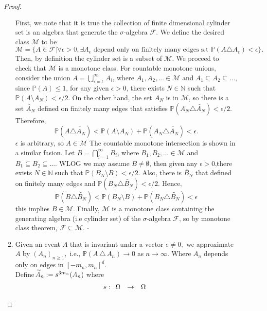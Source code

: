 \documentclass[12pt,a4paper]{report}
\theoremstyle{definition}
\newcommand{\oversim}[1]{\parbox[t][-18pt][c]{10pt}{\scriptsize$\sim$}\hspace*{-12pt}{#1}}
\begin{document}
\begin{enumerate}
\begin{proof}
\begin{enumerate}
				First, we note that it is true the collection of finite dimensional cylinder set is an algebra that generate the $\sigma$-algebra $\mathcal{F}$. We define the desired class $\mathcal{M}$ to be 
				$$
				\mathcal{M} = \{A \in \mathcal{F} | \forall \epsilon > 0, \exists A_\epsilon \text{ depend only on finitely many edges s.t }  \mathbb{P}(A\triangle A_\epsilon) < \epsilon\}.
				$$
				Then, by definition the cylinder set is a subset of $\mathcal{M}$. We proceed to check that $\mathcal{M}$ is a monotone class.
				For countable monotone unions, consider the union $A = \bigcup_{i =1}^\infty A_i$, where $A_1, A_2, \dots \in \mathcal{M}$ and $A_1\subseteq A_2 \subseteq \dots$, since $\mathbb{P}(A) \leq 1$, for any given $\epsilon > 0$, there exists $N \in \mathbb{N}$ such that $\mathbb{P}(A\setminus  A_{N}  ) < \epsilon/2$. 
				On the other hand, the set $A_{N}$ is in $\mathcal{M}$, so there is a set $\tilde{A_{N}}$ defined on finitely many edges that satisfies $\mathbb{P}(A_{N} \triangle \tilde{A_{N}}) < \epsilon/2$. 
				Therefore, 
				$$
					\mathbb{P}(A\triangle \tilde{A_N}) < \mathbb{P}(A\setminus A_N) + \mathbb{P}(A_N\triangle \tilde{A_N}) < \epsilon .
				$$
				$\epsilon$ is arbitrary, so $A \in \mathcal{M}$
				The countable monotone intersection is shown in a similar fasion. Let $B = \bigcap_{i = 1}^\infty B_i$, where $B_1, B_2, \dots \in \mathcal{M}$ and $B_1 \subseteq B_2 \subseteq \dots$. WLOG we may assume $B \neq \emptyset$, then given any $\epsilon > 0$,there exists $N \in \mathbb{N}$ such that $\mathbb{P}(B_N \setminus B) < \epsilon/2$.
				Also, there is $\tilde{B_N}$ that defined on finitely many edges and $\mathbb{P}(B_N \triangle \tilde{B_N}) < \epsilon /2$. Hence,
				$$
					\mathbb{P}(B \triangle \tilde{B_N}) < \mathbb{P}(B_N \setminus B) + \mathbb{P}(B_N \triangle \tilde{B_N}) < \epsilon
				$$
				this implies $B \in \mathcal{M}$.
				Finally,  $\mathcal{M}$ is a monotone class containing the generating algebra (i.e cylinder set) of the $\sigma$-algebra $\mathcal{F}$, so by monotone class theorem, $\mathcal{F} \subseteq \mathcal{M}$. $\square$
		\item[] \qquad Given an event $A$ that is invariant under a vector $e\neq 0,$ we approximate $A$ by $(A_n)_{n\geq 1},$ i.e., $\mathbb{P}(A\,\triangle\, A_n)\to 0$ as $n\to\infty.$ Where $A_n$ depends only on edges in $[-m_n,m_n]^d.$\\
		Define $\oversim{A}_n:=s^{3m_n}(A_n)$ where 
		\[
		s:\begin{array}[c]{rcl}
		\Omega & \to & \Omega\\

\end{array}\]
\end{enumerate}
\end{proof}
\end{enumerate}
\end{document}
